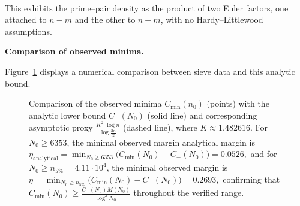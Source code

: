 \documentclass[11pt]{article}
\makeatletter
\theoremstyle{inline}
\theoremstyle{break}
\renewenvironment{proof}[1][\proofname]{%
  \par\pushQED{\qed}%
  \normalfont \topsep6\p@\@plus6\p@\relax
  \trivlist
  \item[\hskip\labelsep
        \itshape
    #1\@addpunct{.}]\mbox{}\\  %
}{%
  \popQED\endtrivlist\@endpefalse
}
\theoremstyle{break}
\theoremstyle{break}
\theoremstyle{break}
\theoremstyle{break}
\theoremstyle{inline}
\newcommand{\xMertens}{6353} %
\newcommand{\xNzeroStat}{71633} %
\newcommand{\xEtaStat}{0.2693} %
\newcommand{\xMinGlobal}{7219}       %
\newcommand{\xDeltaGlobal}{0.0526}   %
\newcommand{\tana}{{\scriptscriptstyle\mathrm{analytical}}}
\newcommand{\Cmeas}{C}              %
\newcommand{\Cminus}{\mathring{C}_{-}}   %
\newcommand{\CminusProduct}{C_{-}}
\newcommand{\CminusAsymp}{C_{-}^{\mathrm{asymp}}}
\makeatother
\begin{document}
\begin{proof}
This exhibits the prime--pair density as the product of two Euler factors,
one attached to \(n-m\) and the other to \(n+m\), with no Hardy--Littlewood
assumptions.\cite{HardyLittlewood1923,Vaughan1997} 

\noindent\textbf{Comparison of observed minima.}

Figure~\ref{fig:lower-analytic-bound-comparison} displays
a numerical comparison between sieve data and this analytic bound.

\cpsdata

\begin{figure}[H]
\centering
{}
\caption{Comparison of the observed minima \( \Cmeas_{\min}(n_0) \) (points) with the analytic lower bound \( \CminusProduct(N_0) \) (solid line)
and corresponding asymptotic proxy \( \tfrac{K^2\;\log{n}}{\log{\frac{3n}{2}}} \) (dashed line), where \( K \approx 1.482616 \).
For \( N_0 \ge \xMertens \), the minimal observed margin analytical margin is
\(\displaystyle 
\eta_{\tana} = \min_{N_0 \ge \xMertens} \bigl( \Cmeas_{\min}(N_0) - \CminusProduct(N_0) ) = \xDeltaGlobal,
\)
and for \( N_0 \ge n_{5\%} = 4.11 \cdot 10^{4} \), the minimal observed margin is
\(\displaystyle 
\eta = \min_{N_0 \ge n_{5\%}} \bigl( \Cmeas_{\min}(N_0) - \CminusProduct(N_0) ) = \xEtaStat,
\)
confirming that \( \Cmeas_{\min}(N_0) \ge \tfrac{\CminusProduct(N_0) M(N_0)}{\log^2{N_0}} \) throughout the verified range.}
\label{fig:lower-analytic-bound-comparison}
\end{figure}



\end{proof}
\end{document}
